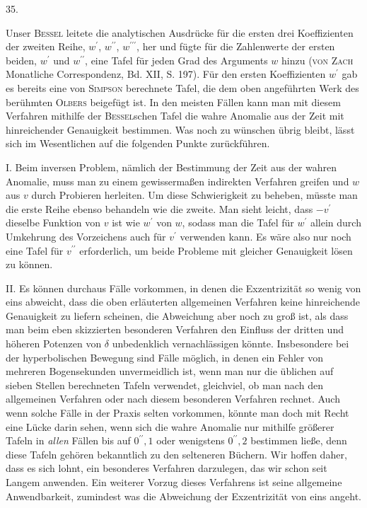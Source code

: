 \par{}
\begin{center}
\hypertarget{native-052-article035}{}35.
\end{center}
Unser \textsc{Bessel} leitete die analytischen Ausdrücke für die ersten drei Koeffizienten der zweiten Reihe, $w^{\prime}$, $w^{\prime\prime}$, $w^{\prime\prime\prime}$, her und fügte für die Zahlenwerte der ersten beiden, $w^{\prime}$ und $w^{\prime\prime}$, eine Tafel für jeden Grad des Arguments $w$ hinzu (\textsc{von Zach} Monatliche Correspondenz, Bd. XII, S. 197). Für den ersten Koeffizienten $w^{\prime}$ gab es bereits eine von \textsc{Simpson} berechnete Tafel, die dem oben angeführten Werk des berühmten \textsc{Olbers} beigefügt ist. In den meisten Fällen kann man mit diesem Verfahren mithilfe der \textsc{Bessel}schen Tafel die wahre Anomalie aus der Zeit mit hinreichender Genauigkeit bestimmen. Was noch zu wünschen übrig bleibt, lässt sich im Wesentlichen auf die folgenden Punkte zurückführen.

I. Beim inversen Problem, nämlich der Bestimmung der Zeit aus der wahren Anomalie, muss man zu einem gewissermaßen indirekten Verfahren greifen und $w$ aus $v$ durch Probieren herleiten. Um diese Schwierigkeit zu beheben, müsste man die erste Reihe ebenso behandeln wie die zweite. Man sieht leicht, dass $-v^{\prime}$ dieselbe Funktion von $v$ ist wie $w^{\prime}$ von $w$, sodass man die Tafel für $w^{\prime}$ allein durch Umkehrung des Vorzeichens auch für $v^{\prime}$ verwenden kann. Es wäre also nur noch eine Tafel für $v^{\prime\prime}$ erforderlich, um beide Probleme mit gleicher Genauigkeit lösen zu können.

II. Es können durchaus Fälle vorkommen, in denen die Exzentrizität so wenig von eins abweicht, dass die oben erläuterten allgemeinen Verfahren keine hinreichende Genauigkeit zu liefern scheinen, die Abweichung aber noch zu groß ist, als dass man beim eben skizzierten besonderen Verfahren den Einfluss der dritten und höheren Potenzen von $\delta$ unbedenklich vernachlässigen könnte. Insbesondere bei der hyperbolischen Bewegung sind Fälle möglich, in denen ein Fehler von mehreren Bogensekunden unvermeidlich ist, wenn man nur die üblichen auf sieben Stellen berechneten Tafeln verwendet, gleichviel, ob man nach den allgemeinen Verfahren oder nach diesem besonderen Verfahren rechnet. Auch wenn solche Fälle in der Praxis selten vorkommen, könnte man doch mit Recht eine Lücke darin sehen, wenn sich die wahre Anomalie nur mithilfe größerer Tafeln in \emph{allen} Fällen bis auf $0^{\prime\prime}{,}1$ oder wenigstens $0^{\prime\prime}{,}2$ bestimmen ließe, denn diese Tafeln gehören bekanntlich zu den selteneren Büchern. Wir hoffen daher, dass es sich lohnt, ein besonderes Verfahren darzulegen, das wir schon seit Langem anwenden. Ein weiterer Vorzug dieses Verfahrens ist seine allgemeine Anwendbarkeit, zumindest was die Abweichung der Exzentrizität von eins angeht.

